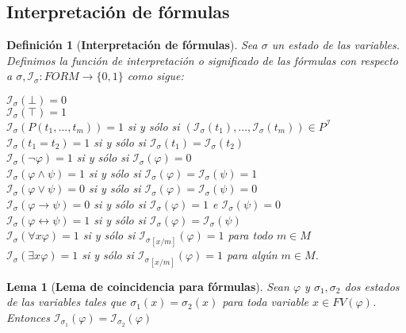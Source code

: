 \documentclass[letterpaper,12pt]{article}
\newtheorem{define}{Definición}[]
\newtheorem{lema}{Lema}[]
\begin{document}
    \subsection{Interpretación de fórmulas}
    \begin{define}[\textbf{Interpretación de fórmulas}]
      Sea $\sigma$ un estado de las variables. Definimos la función de 
      interpretación o significado de las fórmulas con respecto a 
      $\sigma, \mathcal{I_{\sigma}}: FORM \rightarrow \{ 0,1 \}$ como 
      sigue:
      \begin{center}
        $\mathcal{I_{\sigma}}(\bot) = 0$ \\
        $\mathcal{I_{\sigma}}(\top) = 1$ \\
        $\mathcal{I_{\sigma}}(P(t_{1},...,t_{m})) = 1$ si y sólo si 
        $(\mathcal{I_{\sigma}}(t_{1}), ..., \mathcal{I_{\sigma}}(t_{m})) 
        \in P^{\mathcal{I}}$ \\
        $\mathcal{I_{\sigma}}(t_{1}=t_{2}) = 1$ si y sólo si 
        $\mathcal{I_{\sigma}}(t_{1}) = \mathcal{I_{\sigma}}(t_{2})$ \\
        $\mathcal{I_{\sigma}}(\neg \varphi) = 1$ si y sólo si 
        $\mathcal{I_{\sigma}}(\varphi) = 0$ \\
        $\mathcal{I_{\sigma}}(\varphi \land \psi) = 1$ si y sólo si 
        $\mathcal{I_{\sigma}}(\varphi) = \mathcal{I_{\sigma}}(\psi) = 1$ \\
        $\mathcal{I_{\sigma}}(\varphi \lor \psi) = 0$ si y sólo si 
        $\mathcal{I_{\sigma}}(\varphi) = \mathcal{I_{\sigma}}(\psi) = 0$ \\
        $\mathcal{I_{\sigma}}(\varphi \rightarrow \psi) = 0$ si y sólo si 
        $\mathcal{I_{\sigma}}(\varphi) = 1$ e $\mathcal{I_{\sigma}}(\psi) = 0$ \\
        $\mathcal{I_{\sigma}}(\varphi \leftrightarrow \psi) = 1$ si y sólo si 
        $\mathcal{I_{\sigma}}(\varphi) = \mathcal{I_{\sigma}}(\psi)$ \\
        $\mathcal{I_{\sigma}}(\forall x \varphi) = 1$ si y sólo si 
        $\mathcal{I_{\sigma}}_{[x/m]}(\varphi) = 1$ para todo $m \in M$ \\
        $\mathcal{I_{\sigma}}(\exists x \varphi) = 1$ si y sólo si
        $\mathcal{I_{\sigma}}_{[x/m]}(\varphi) = 1$ para algún $m \in M$.
      \end{center}

    \end{define}

    \begin{lema} [\textbf{Lema de coincidencia para fórmulas}]
      Sean $\varphi$ y $\sigma_{1}, \sigma_{2}$ dos estados de las variables 
      tales que $\sigma_{1}(x) = \sigma_{2}(x)$ para toda variable 
      $x \in FV(\varphi)$. Entonces $\mathcal{I}_{\sigma_{1}}(\varphi) = 
      \mathcal{I}_{\sigma_{2}}(\varphi)$
    \end{lema}
\end{document}

